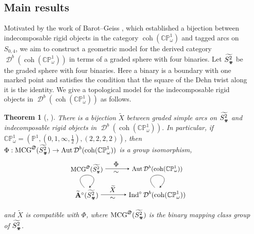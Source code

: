 \documentclass[11pt,a4paper,reqno]{amsart}%
\theoremstyle{plain}
\newtheorem{theorem}{Theorem}[section]
\theoremstyle{definition}
\numberwithin{equation}{section}
\numberwithin{equation}{section}
\newcommand{\Ind}{\operatorname{Ind}\nolimits}
\newcommand{\D}{\operatorname{\mathcal{D}}}
\def\wt{\omega}
\def\x{_\vot}
\newcommand{\MCG}{\operatorname{MCG}}
\def\coh{\operatorname{coh}}
\def\Aut{\operatorname{Aut}}
\def\Ind{\operatorname{Ind}}
\def\A{\mathbf{A}}
\def\coh{\operatorname{coh}}
\def\CPone{\mathbb{CP}^1_{\wt}}
\newcommand\DC[1]{\D^b(\coh(#1))}
\def\wA{\widetilde{\A}}
\def\wX{\widetilde{X}}
\def\vot{\text{\Biohazard}}
\def\sx{\text{\Cancer}}
\begin{document}
\subsection{Main results}

Motivated by the   work  of  Barot--Geiss  \cite{BG}, which   established a bijection between indecomposable rigid objects in the category $\coh(\CPone)$ and tagged arcs on $S_{0,4}$, we aim to construct a geometric model for the derived category $\DC{\CPone}$ in terms of a  graded sphere with four binaries.
Let    $\widetilde{S\x^2}$ be  the graded  sphere with four binaries. Here a binary is   a boundary with one marked point and satisfies the condition that the square of the Dehn twist along it is the identity. We give a topological model for the indecomposable rigid objects in $\DC{\CPone}$ as follows.
\begin{theorem}[{, }]
  There is a bijection $\wX$ between graded simple arcs on $\widetilde{S\x^2}$ and indecomposable rigid objects in $\DC{\CPone}$. In particular, if $\CPone=(\mathbb{P}^1,(0,1,\infty,\frac{1}{2}),(2,2,2,2))$, then $\Phi: \MCG^\sx(\widetilde{S\x^2})\to \Aut\DC{\CPone}$ is a group isomorphism,
   \begin{equation}
\begin{tikzpicture}[xscale=.6,yscale=.6]
\draw(180:3)node(o){$\wA^\circ(\widetilde{S\x^2} )$}(-3,2.2)node(b){\small{$\MCG^\sx(\widetilde{S\x^2})$}}
(-.8,.5)node{$\wX$} (-.8,-.3)node{$\sim$};
\draw(0:3)node(a){$\Ind^\circ\DC{\CPone}$}(3,2.2)node(s){\small{$\Aut\DC{\CPone}$}};
\draw[->,>=stealth](o)to(a);\draw[->,>=stealth](b)to(s);
\draw[->,>=stealth](-3.2,.6).. controls +(135:2) and +(45:2) ..(-3+.2,.6);
\draw[->,>=stealth](3-.2,.6).. controls +(135:2) and +(45:2) ..(3+.2,.6);
\draw (-.5,2.6)node{$\Phi$} (-.5,1.9)node{$\sim$};
\end{tikzpicture}
\end{equation}
and $\wX$ is compatible with $\Phi$, where $\MCG^\sx(\widetilde{S\x^2})$ is the binary mapping class group of $\widetilde{S\x^2}$.
\end{theorem} 
\end{document}
